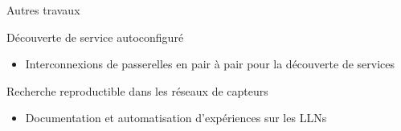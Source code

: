 \begin{frame}{Autres travaux}
  
  \begin{block}{Découverte de service autoconfiguré}
    \begin{itemize}
      \item Interconnexions de passerelles en pair à pair pour la découverte de services
    \end{itemize}
  \end{block}

  \begin{alertblock}{Recherche reproductible dans les réseaux de capteurs}
    \begin{itemize}
      \item Documentation et automatisation d'expériences sur les LLNs
    \end{itemize}
  \end{alertblock}




\end{frame}


